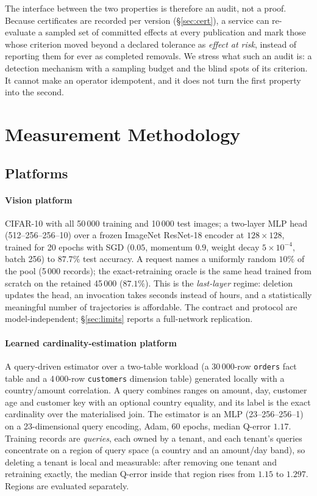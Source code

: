 \documentclass[conference]{IEEEtran}
\begin{document}
The interface between the two properties is therefore an audit, not a proof.  Because
certificates are recorded per version (\S\ref{sec:cert}), a service can re-evaluate a
sampled set of committed effects at every publication and mark those whose criterion moved
beyond a declared tolerance as \emph{effect at risk}, instead of reporting them for ever as
completed removals.  We stress what such an audit is: a detection mechanism with a
sampling budget and the blind spots of its criterion.  It cannot make an operator
idempotent, and it does not turn the first property into the second.

\section{Measurement Methodology}
\label{sec:methodology}

\subsection{Platforms}

\paragraph{Vision platform}
CIFAR-10 \cite{krizhevsky2009learning} with all 50\,000 training and 10\,000 test images;
a two-layer MLP head (512--256--256--10) over a frozen ImageNet ResNet-18 encoder at
$128\times128$, trained for 20 epochs with SGD ($0.05$, momentum $0.9$, weight decay
$5\times10^{-4}$, batch 256) to $87.7\%$ test accuracy.  A request names a uniformly random
$10\%$ of the pool (5\,000 records); the exact-retraining oracle is the same head trained from
scratch on the retained 45\,000 ($87.1\%$).  This is the \emph{last-layer} regime: deletion
updates the head, an invocation takes seconds instead of hours, and a statistically meaningful
number of trajectories is affordable.  The contract and protocol are model-independent;
\S\ref{sec:limits} reports a full-network replication.

\paragraph{Learned cardinality-estimation platform}
A query-driven estimator over a two-table workload (a 30\,000-row \texttt{orders} fact
table and a 4\,000-row \texttt{customers} dimension table) generated locally with a
country/amount correlation.  A query combines ranges on amount, day, customer age and
customer key with an optional country equality, and its label is the exact cardinality
over the materialised join.  The estimator is an MLP (23--256--256--1) on a
23-dimensional query encoding, Adam, 60 epochs, median Q-error $1.17$.  Training records
are \emph{queries}, each owned by a tenant, and each tenant's queries concentrate on a
region of query space (a country and an amount/day band), so deleting a tenant is local
and measurable: after removing one tenant and retraining exactly, the median Q-error
inside that region rises from $1.15$ to $1.297$.  Regions are evaluated separately.
\end{document}
